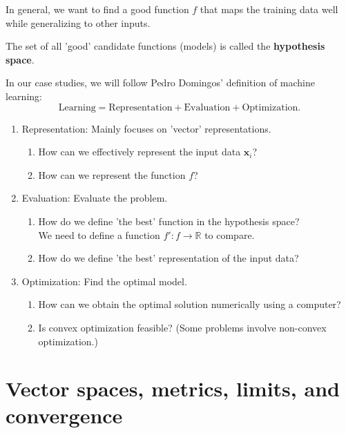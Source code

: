 \documentclass{huhtakm-template-book-v2}
\begin{document}
    In general, we want to find a good function $f$ that maps the training data well while generalizing to other inputs.
    \begin{defn}
        The set of all 'good' candidate functions (models) is called the \textbf{hypothesis space}.
    \end{defn}
    In our case studies, we will follow Pedro Domingos' definition of machine learning:
    \begin{equation*}
        \text{Learning} = \text{Representation} + \text{Evaluation} + \text{Optimization}.
    \end{equation*}
    \begin{enumerate}
        \item Representation: Mainly focuses on 'vector' representations.
        \begin{enumerate}
            \item How can we effectively represent the input data $\mathbf{x}_{i}$?
            \item How can we represent the function $f$?
        \end{enumerate}
        \item Evaluation: Evaluate the problem.
        \begin{enumerate}
            \item How do we define 'the best' function in the hypothesis space?\\
            We need to define a function $f': f \to \mathbb{R}$ to compare.
            \item How do we define 'the best' representation of the input data?
        \end{enumerate}
        \item Optimization: Find the optimal model.
        \begin{enumerate}
            \item How can we obtain the optimal solution numerically using a computer?
            \item Is convex optimization feasible? (Some problems involve non-convex optimization.)
        \end{enumerate}
    \end{enumerate}

\chapter{Vector spaces, metrics, limits, and convergence}
    \label{Chapter 2: Vector spaces, metrics, limits, and convergence}
\end{document}
